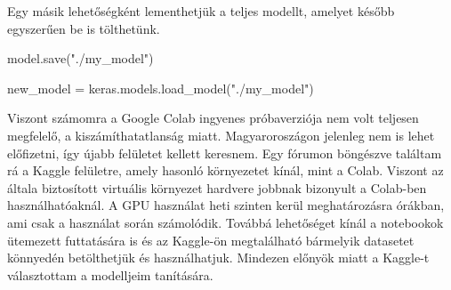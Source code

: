 Egy másik lehetőségként lementhetjük a teljes modellt, amelyet később egyszerűen be is tölthetünk.
\begin{python}
model.save("./my_model")

new_model = keras.models.load_model("./my_model")
\end{python}
Viszont számomra a Google Colab ingyenes próbaverziója nem volt teljesen megfelelő, a kiszámíthatatlanság miatt. Magyaroroszágon jelenleg nem is lehet előfizetni, így újabb felületet kellett keresnem. Egy fórumon böngészve találtam rá a Kaggle felületre, amely hasonló környezetet kínál, mint a Colab. Viszont az általa biztosított virtuális környezet hardvere jobbnak bizonyult a Colab-ben használhatóaknál. A GPU használat heti szinten kerül meghatározásra órákban, ami csak a használat során számolódik. Továbbá lehetőséget kínál a notebookok ütemezett futtatására is és az Kaggle-ön megtalálható bármelyik datasetet könnyedén betölthetjük és használhatjuk. Mindezen előnyök miatt a Kaggle-t választottam a modelljeim tanítására.

